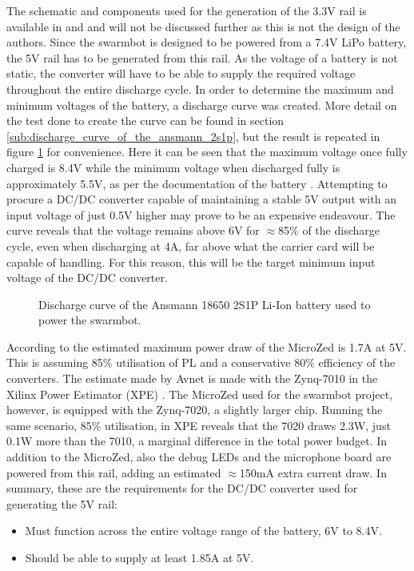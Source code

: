 The schematic and components used for the generation of the 3.3V rail is available in \cite{carrier_schematic} and  and will not be discussed further as this is not the design of the authors.
Since the swarmbot is designed to be powered from a 7.4V LiPo battery, the 5V rail has to be generated from this rail.
As the voltage of a battery is not static, the converter will have to be able to supply the required voltage throughout the entire discharge cycle.
In order to determine the maximum and minimum voltages of the battery, a discharge curve was created.
More detail on the test done to create the curve can be found in section \ref{sub:discharge_curve_of_the_ansmann_2s1p}, but the result is repeated in figure \ref{fig:discharge_repeat} for convenience.
Here it can be seen that the maximum voltage once fully charged is 8.4V while the minimum voltage when discharged fully is approximately 5.5V, as per the documentation of the battery \cite{battery}.
Attempting to procure a DC/DC converter capable of maintaining a stable 5V output with an input voltage of just 0.5V higher may prove to be an expensive endeavour.
The curve reveals that the voltage remains above 6V for $\approx$85\% of the discharge cycle, even when discharging at 4A, far above what the carrier card will be capable of handling.
For this reason, this will be the target minimum input voltage of the DC/DC converter.
\begin{figure}
	\centering
	
	\caption{Discharge curve of the Ansmann 18650 2S1P Li-Ion battery used to power the swarmbot.}
	\label{fig:discharge_repeat}
\end{figure}
According to \cite{microzed_hardware_guide} the estimated maximum power draw of the MicroZed is 1.7A at 5V.
This is assuming 85\% utilisation of PL and a conservative 80\% efficiency of the converters.
The estimate made by Avnet is made with the Zynq-7010 in the Xilinx Power Estimator (XPE) \cite{xpe}.
The MicroZed used for the swarmbot project, however, is equipped with the Zynq-7020, a slightly larger chip.
Running the same scenario, 85\% utilisation, in XPE reveals that the 7020 draws 2.3W, just 0.1W more than the 7010, a marginal difference in the total power budget.
In addition to the MicroZed, also the debug LEDs and the microphone board are powered from this rail, adding an estimated $\approx$150mA extra current draw.
In summary, these are the requirements for the DC/DC converter used for generating the 5V rail:

\begin{itemize}
	\item Must function across the entire voltage range of the battery, 6V to 8.4V.
	\item Should be able to supply at least 1.85A at 5V.
\end{itemize}


